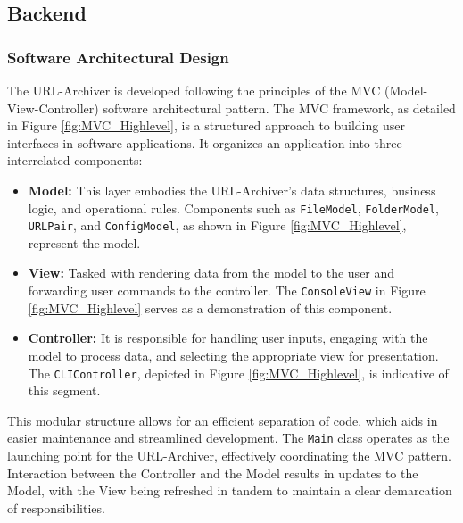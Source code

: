 \clearpage

\subsection{Backend}

\subsubsection{Software Architectural Design}
The URL-Archiver is developed following the principles of the MVC (Model-View-Controller) software architectural pattern. The MVC framework, as detailed in Figure \ref{fig:MVC_Highlevel}, is a structured approach to building user interfaces in software applications. It organizes an application into three interrelated components:

\begin{itemize}
	\item \textbf{Model:} This layer embodies the URL-Archiver's data structures, business logic, and operational rules. Components such as \texttt{FileModel}, \texttt{FolderModel}, \texttt{URLPair}, and \texttt{ConfigModel}, as shown in Figure \ref{fig:MVC_Highlevel}, represent the model.
	\item \textbf{View:} Tasked with rendering data from the model to the user and forwarding user commands to the controller. The \texttt{ConsoleView} in Figure \ref{fig:MVC_Highlevel} serves as a demonstration of this component.
	\item \textbf{Controller:} It is responsible for handling user inputs, engaging with the model to process data, and selecting the appropriate view for presentation. The \texttt{CLIController}, depicted in Figure \ref{fig:MVC_Highlevel}, is indicative of this segment.
\end{itemize}

This modular structure allows for an efficient separation of code, which aids in easier maintenance and streamlined development. The \texttt{Main} class operates as the launching point for the URL-Archiver, effectively coordinating the MVC pattern. Interaction between the Controller and the Model results in updates to the Model, with the View being refreshed in tandem to maintain a clear demarcation of responsibilities.

